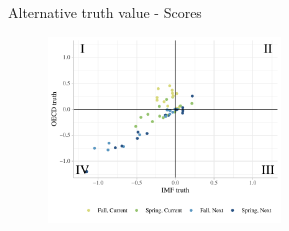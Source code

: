 \documentclass[en]{sdqbeamer}
\begin{document}
\begin{frame}{Alternative truth value - Scores}
\label{alternativetruth}
    \begin{figure}
        \includegraphics[width=0.55\textwidth]{figures/ho_oecdvsimf.pdf}
        \label{fig:enter-label}
    \end{figure}   
\end{frame}
\end{document}
